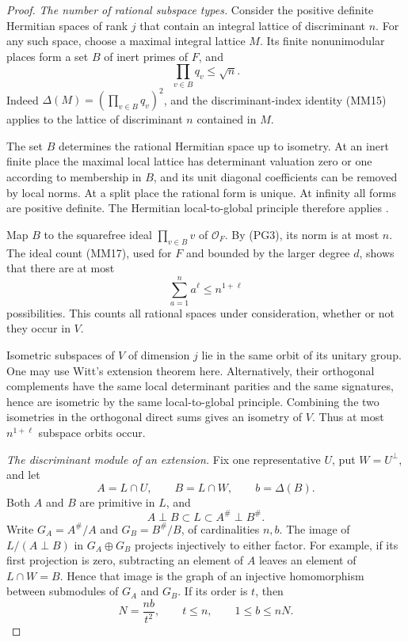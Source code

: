 \begin{proof}
\smallskip\noindent\emph{The number of rational subspace types.}
Consider the positive definite Hermitian spaces of rank \(j\)
that contain an integral lattice of discriminant \(n\).
For any such space, choose a maximal integral lattice \(M\).
Its finite nonunimodular places form a set \(B\) of inert
primes of \(F\), and
\[
 \prod_{v\in B}q_v\leq\sqrt n.
 \tag{PG3}
\]
Indeed \(\Delta(M)=(\prod_{v\in B}q_v)^2\), and the
discriminant-index identity (MM15) applies to the lattice
of discriminant \(n\) contained in \(M\).

The set \(B\) determines the rational Hermitian space up to
isometry.  At an inert finite place the maximal local lattice
has determinant valuation zero or one according to membership
in \(B\), and its unit diagonal coefficients can be removed
by local norms.  At a split place the rational form is unique.
At infinity all forms are positive definite.  The Hermitian
local-to-global principle therefore applies
\cite[Theorem 2.4.1]{kirschmer-herm}.

Map \(B\) to the squarefree ideal \(\prod_{v\in B}v\) of
\(\mathcal O_F\).  By (PG3), its norm is at most \(n\).
The ideal count (MM17), used for \(F\) and bounded by
the larger degree \(d\), shows that there are at most
\[
 \sum_{a=1}^{n}a^\ell\leq n^{1+\ell}
 \tag{PG4}
\]
possibilities.  This counts all rational spaces under
consideration, whether or not they occur in \(V\).

Isometric subspaces of \(V\) of dimension \(j\) lie in
the same orbit of its unitary group.  One may use Witt's
extension theorem here.  Alternatively, their orthogonal
complements have the same local determinant parities and
the same signatures, hence are isometric by the same
local-to-global principle.  Combining the two isometries
in the orthogonal direct sums gives an isometry of \(V\).
Thus at most \(n^{1+\ell}\) subspace orbits occur.

\smallskip\noindent\emph{The discriminant module of an extension.}
Fix one representative \(U\), put \(W=U^\perp\), and let
\[
 A=L\cap U,\qquad B=L\cap W,\qquad b=\Delta(B).
\]
Both \(A\) and \(B\) are primitive in \(L\), and
\[
 A\perp B\subset L\subset A^\#\perp B^\#.
 \tag{PG5}
\]
Write \(G_A=A^\#/A\) and \(G_B=B^\#/B\), of cardinalities
\(n,b\).  The image of \(L/(A\perp B)\) in \(G_A\oplus G_B\)
projects injectively to either factor.  For example, if its
first projection is zero, subtracting an element of \(A\)
leaves an element of \(L\cap W=B\).  Hence that image is
the graph of an injective homomorphism between submodules
of \(G_A\) and \(G_B\).  If its order is \(t\), then
\[
 N=\frac{nb}{t^2},\qquad t\leq n,\qquad
                         1\leq b\leq nN.
 \tag{PG6}
\]


\end{proof}
